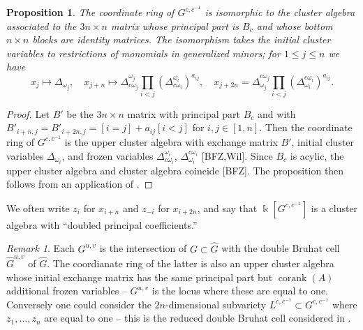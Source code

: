 \documentclass[12pt]{amsart}
\newcommand{\kk}{\Bbbk}%
\DeclareMathOperator{\corank}{corank}
\newtheorem{proposition}[theorem]{Proposition}
\theoremstyle{remark}
\newtheorem{remark}[theorem]{Remark}
\numberwithin{equation}{section}
\begin{document}
\begin{proposition}\label{prop:coordring}
The coordinate ring of $G^{c,c^{-1}}$ is isomorphic to the cluster algebra associated to the $3n \times n$ matrix whose principal part is $B_c$ and whose bottom $n \times n$ blocks are identity matrices. 
The isomorphism takes the initial cluster variables to restrictions of monomials in generalized minors; for $1 \leq j \leq n$ we have 
\begin{equation}\label{eq:initialcluster}
x_j \mapsto \Delta_{\omega_j},\quad x_{j+n} \mapsto \Delta^{\omega_j}_{ c\omega_j} \prod_{i < j}(\Delta^{\omega_i}_{c \omega_i})^{a_{ij}},\quad x_{j+2n} = \Delta^{c \omega_j}_{\omega_j} \prod_{i < j}(\Delta^{c \omega_i}_{\omega_i})^{a_{ij}}.
\end{equation}
\end{proposition}
\begin{proof}
Let $B'$ be the $3n \times n$ matrix with principal part $B_c$ and with $B'_{i+n,j} = B'_{i+2n,j} = [i = j] + a_{ij}[i < j]$ for $i,j \in [1,n]$.  Then the coordinate ring of $G^{c,c^{-1}}$ is the upper cluster algebra with exchange matrix $B'$, initial cluster variables $\Delta_{\omega_i}$, and frozen variables $\Delta^{\omega_i}_{c \omega_i}$, $\Delta^{c \omega_i}_{\omega_i}$ [BFZ,Wil]. Since $B_c$ is acylic, the upper cluster algebra and cluster algebra coincide [BFZ]. The proposition then follows from an application of .
\end{proof}

We often write $z_i$ for $x_{i+n}$ and $z_{-i}$ for $x_{i+2n}$, and say that $\kk[G^{c,c^{-1}}]$ is a cluster algebra with ``doubled principal coefficients.''

\begin{remark}
Each $G^{u,v}$ is the intersection of $G \subset \widehat{G}$ with the double Bruhat cell $\widehat{G}^{u,v}$ of $\widehat{G}$. The coordianate ring of the latter is also an upper cluster algebra whose initial exchange matrix has the same principal part but $\corank(A)$ additional frozen variables -- $G^{u,v}$ is the locus where these are equal to one. Conversely one could consider the $2n$-dimensional subvariety $L^{c,c^{-1}} \subset G^{c,c^{-1}}$ where $z_1,\dotsc,z_n$ are equal to one -- this is the reduced double Bruhat cell considered in \cite{YZ08}.
\end{remark}
\end{document}

